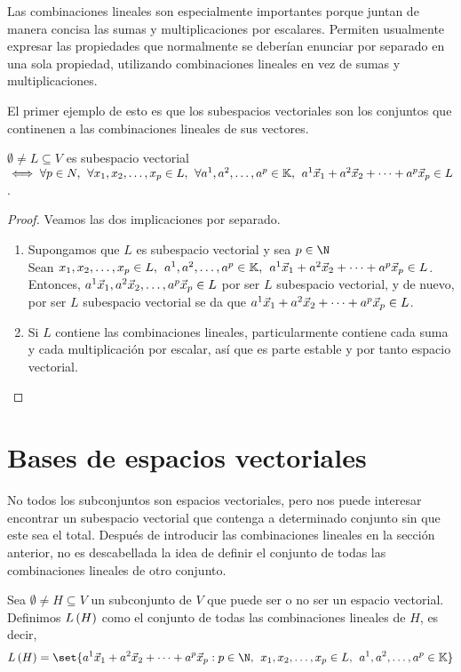 \documentclass[../algebra_lineal.tex]{subfiles}
\begin{document}
Las combinaciones lineales son especialmente importantes porque juntan de manera concisa las sumas y multiplicaciones por escalares. Permiten usualmente expresar las propiedades que normalmente se deberían enunciar por separado en una sola propiedad, utilizando combinaciones lineales en vez de sumas y multiplicaciones. 

El primer ejemplo de esto es que los subespacios vectoriales son los conjuntos que continenen a las combinaciones lineales de sus vectores.


\begin{proposition}
    $\emptyset \ne L \subseteq V$ es subespacio vectorial $\iff \forall p \in N, \hspace{1.5mm} \forall {x}_{1}, {x}_{2}, \dots, {x}_{p} \in L, \hspace{1.5mm} \forall {a}^{1}, {a}^{2}, \dots, {a}^{p} \in \mathbb{K}, \hspace{1.5mm} {a}^{1}\vec{x}_{1}+{a}^{2}\vec{x}_{2}+\dots+{a}^{p}\vec{x}_{p} \in L$.
\end{proposition}

\begin{proof}
    Veamos las dos implicaciones por separado.
    \begin{enumerate}
        \item[\protect\fbox{$\Rightarrow$}] Supongamos que $L$ es subespacio vectorial y sea $p \in \N$ \\
        Sean ${x}_{1}, {x}_{2}, \dots, {x}_{p} \in L, \hspace{1.5mm} {a}^{1}, {a}^{2}, \dots, {a}^{p} \in \mathbb{K}, \hspace{1.5mm} {a}^{1}\vec{x}_{1}+{a}^{2}\vec{x}_{2}+\dots+{a}^{p}\vec{x}_{p} \in L$. Entonces, $a^1 \vec{x}_1, a^2\vec{x}_2, \dots, a^p\vec{x}_p \in L$ por ser $L$ subespacio vectorial, y de nuevo, por ser $L$ subespacio vectorial se da que ${a}^{1}\vec{x}_{1}+{a}^{2}\vec{x}_{2}+\dots+{a}^{p}\vec{x}_{p} \in L$. 
        \item[\protect\fbox{$\Leftarrow$}] Si $L$ contiene las combinaciones lineales, particularmente contiene cada suma y cada multiplicación por escalar, así que es parte estable y por tanto espacio vectorial.
    \end{enumerate} 
\end{proof}

\section{Bases de espacios vectoriales}

No todos los subconjuntos son espacios vectoriales, pero nos puede interesar encontrar un subespacio vectorial que contenga a determinado conjunto sin que este sea el total. Después de introducir las combinaciones lineales en la sección anterior, no es descabellada la idea de definir el conjunto de todas las combinaciones lineales de otro conjunto.

\begin{definition}
    Sea $\emptyset \neq H \subseteq V$ un subconjunto de $V$ que puede ser o no ser un espacio vectorial. Definimos $L\left(H\right)$ como el conjunto de todas las combinaciones lineales de $H$, es decir,
    \[
        \lspan{H} = \set{\lincomb{a}{x}{p} : p \in \N, \spc \dlst{x}{p} \in L, \spc \ulst{a}{p} \in \K}
    \]
\end{definition}
\end{document}
